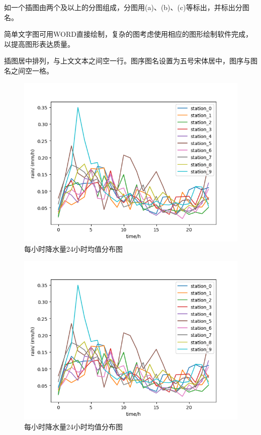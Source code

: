 \documentclass{seuthesis-2022}
\begin{document}
如一个插图由两个及以上的分图组成，分图用(a)、(b)、(c)等标出，并标出分图名。

简单文字图可用WORD直接绘制，复杂的图考虑使用相应的图形绘制软件完成，以提高图形表达质量。

插图居中排列，与上文文本之间空一行。图序图名设置为五号宋体居中，图序与图名之间空一格。

\begin{figure}[H]
    \centering
    \includegraphics{fig/降水量均值分布图.png}
    \caption{每小时降水量24小时均值分布图}
\end{figure}

\begin{figure}[H]
    \centering
    \includegraphics{fig/降水量均值分布图.png}
    \caption{每小时降水量24小时均值分布图}
\end{figure}
\end{document}
